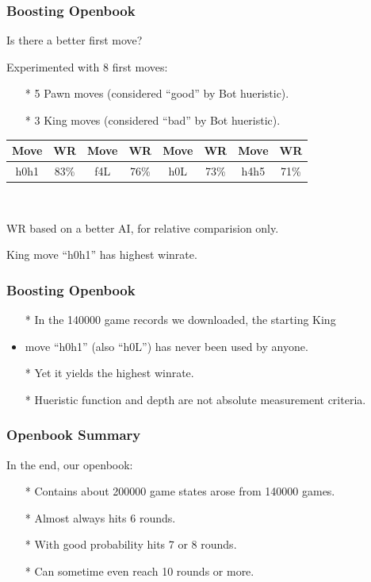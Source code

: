 \documentclass[10pt]{beamer}
\begin{document}
	\begin{frame}
		\frametitle{Boosting Openbook}

		Is there a better first move?\pause

		Experimented with 8 first moves:
		\begin{itemize}
		\item[*] \textcolor{fgreen}{5} Pawn moves (considered ``\textcolor{fgreen}{good}'' by Bot hueristic).
		\item[*] \textcolor{fgreen}{3} King moves (considered ``\textcolor{dred}{bad}'' by Bot hueristic).
		\end{itemize}
		\pause
		\begin{center}
\begin{tabular}{cc|cc|cc|cc}\hline\hline
Move & WR   & Move & WR   & Move & WR   & Move & WR   \\\hline
h0h1 & \textcolor{fgreen}{83\%} & f4L  & 76\% & h0L  & 73\% & h4h5 & 71\% \\\hline\hline
\end{tabular}

\

{\small WR based on a better AI, for relative comparision only.}
		\end{center}

		King move ``h0h1'' has highest winrate.

	\end{frame}

	\begin{frame}
		\frametitle{Boosting Openbook}

		\begin{itemize}
		\item[*] In the 140000 game records we downloaded, the starting King
		\item move ``h0h1'' (also ``h0L'') has never been used by anyone.\pause
		\item[*] Yet it yields the highest winrate. \pause
		\item[*] Hueristic function and depth are not absolute measurement criteria.
		\end{itemize}

	\end{frame}

	\begin{frame}
		\frametitle{Openbook Summary}

		In the end, our openbook:
		\begin{itemize}
		\item[*] Contains about \textcolor{fgreen}{200000} game states arose from \textcolor{fgreen}{140000} games.
		\item[*] Almost always hits \textcolor{fgreen}{6} rounds.
		\item[*] With good probability hits \textcolor{fgreen}{7} or \textcolor{fgreen}{8} rounds.
		\item[*] Can sometime even reach \textcolor{fgreen}{10} rounds or more.
		\end{itemize}
	\end{frame}
\end{document}
